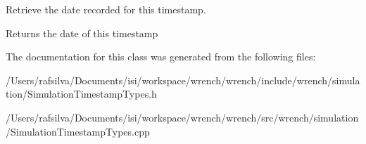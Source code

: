 Retrieve the date recorded for this timestamp. 

\begin{DoxyReturn}{Returns}
the date of this timestamp 
\end{DoxyReturn}


The documentation for this class was generated from the following files\+:\begin{DoxyCompactItemize}
\item 
/\+Users/rafsilva/\+Documents/isi/workspace/wrench/wrench/include/wrench/simulation/Simulation\+Timestamp\+Types.\+h\item 
/\+Users/rafsilva/\+Documents/isi/workspace/wrench/wrench/src/wrench/simulation/Simulation\+Timestamp\+Types.\+cpp\end{DoxyCompactItemize}
